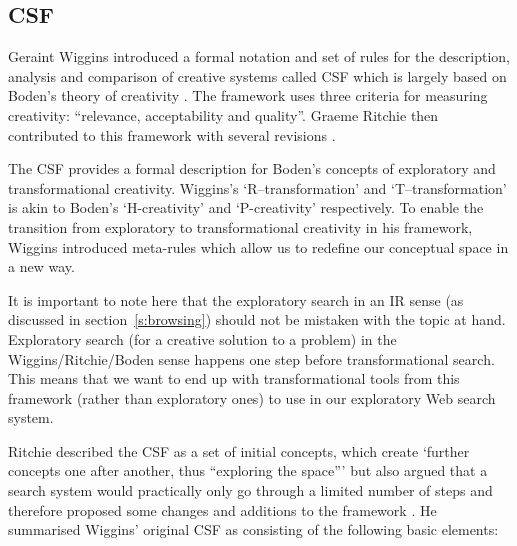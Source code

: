 \subsection{CSF}
\label{s:csf}

Geraint Wiggins introduced a formal notation and set of rules for the description, analysis and comparison of creative systems called \ac{CSF}\citeyear{Wiggins2006} which is largely based on Boden's theory of creativity \citeyear{Boden2003}. The framework uses three criteria for measuring creativity: ``relevance, acceptability and quality''. Graeme Ritchie then contributed to this framework with several revisions \citeyear{Ritchie2012}.


The \ac{CSF} provides a formal description for Boden's concepts of exploratory and transformational creativity. Wiggins's `R–transformation' and `T–transformation' is akin to Boden's `H-creativity' and `P-creativity' respectively. To enable the transition from exploratory to transformational creativity in his framework, Wiggins introduced meta-rules which allow us to redefine our conceptual space in a new way.

It is important to note here that the exploratory search in an \ac{IR} sense (as discussed in section~\ref{s:browsing}) should not be mistaken with the topic at hand. Exploratory search (for a creative solution to a problem) in the Wiggins/Ritchie/Boden sense happens one step before transformational search. This means that we want to end up with transformational tools from this framework (rather than exploratory ones) to use in our exploratory Web search system.

Ritchie described the \ac{CSF} as a set of initial concepts, which create `further concepts one after another, thus ``exploring the space''' but also argued that a search system would practically only go through a limited number of steps and therefore proposed some changes and additions to the framework \citeyear{Ritchie2012}. He summarised Wiggins' original \ac{CSF} as consisting of the following basic elements:


